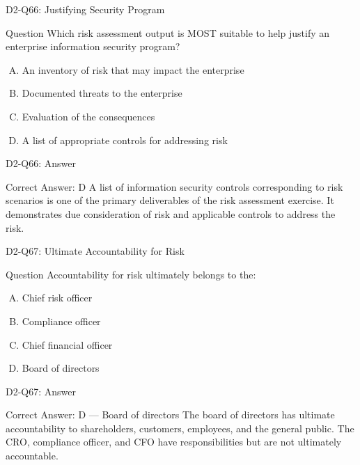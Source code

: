 \documentclass{beamer}
\begin{document}
	\begin{frame}{D2-Q66: Justifying Security Program}
		\begin{block}{Question}
			Which risk assessment output is MOST suitable to help justify an enterprise information security program?
		\end{block}
		\begin{enumerate}[(A)]
			\item An inventory of risk that may impact the enterprise
			\item Documented threats to the enterprise
			\item Evaluation of the consequences
			\item A list of appropriate controls for addressing risk
		\end{enumerate}
	\end{frame}
	\begin{frame}{D2-Q66: Answer}
		\begin{block}{Correct Answer: D}
			A list of information security controls corresponding to risk scenarios is one of the primary deliverables of the risk assessment exercise. It demonstrates due consideration of risk and applicable controls to address the risk.
		\end{block}
	\end{frame}
	
	\begin{frame}{D2-Q67: Ultimate Accountability for Risk}
		\begin{block}{Question}
			Accountability for risk ultimately belongs to the:
		\end{block}
		\begin{enumerate}[(A)]
			\item Chief risk officer
			\item Compliance officer
			\item Chief financial officer
			\item Board of directors
		\end{enumerate}
	\end{frame}
	\begin{frame}{D2-Q67: Answer}
		\begin{block}{Correct Answer: D --- Board of directors}
			The board of directors has ultimate accountability to shareholders, customers, employees, and the general public. The CRO, compliance officer, and CFO have responsibilities but are not ultimately accountable.
		\end{block}
	\end{frame}
	
\end{document}
